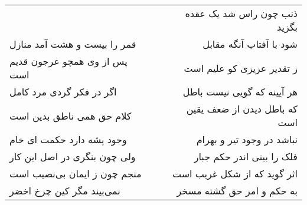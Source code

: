 \begin{center}
\begin{longtable}{l p{0.5cm} r}
&&
ذنب چون راس شد یک عقده بگزید
\\
قمر را بیست و هشت آمد منازل
&&
شود با آفتاب آنگه مقابل
\\
پس از وی همچو عرجون قدیم است
&&
ز تقدیر عزیزی کو علیم است
\\
اگر در فکر گردی مرد کامل
&&
هر آیینه که گویی نیست باطل
\\
کلام حق همی ناطق بدین است
&&
که باطل دیدن از ضعف یقین است
\\
وجود پشه دارد حکمت ای خام
&&
نباشد در وجود تیر و بهرام
\\
ولی چون بنگری در اصل این کار
&&
فلک را بینی اندر حکم جبار
\\
منجم چون ز ایمان بی‌نصیب است
&&
اثر گوید که از شکل غریب است
\\
نمی‌بیند مگر کین چرخ اخضر
&&
به حکم و امر حق گشته مسخر
\\
\end{longtable}
\end{center}
